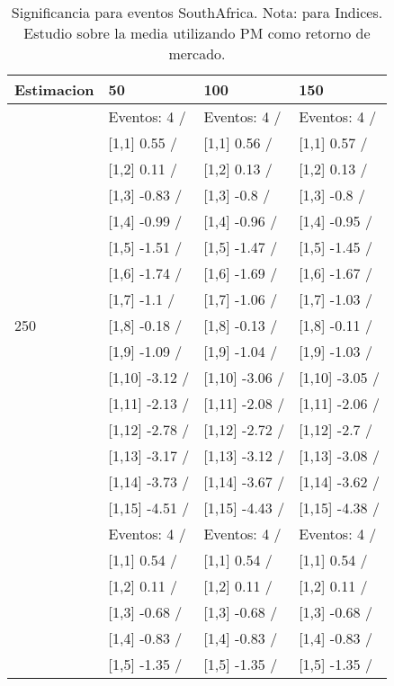 \begin{table}

\caption{Significancia para eventos SouthAfrica. Nota: para Indices. Estudio sobre la media utilizando PM como retorno de mercado.}
\centering
\begin{tabular}[t]{llll}
\toprule
Estimacion & 50 & 100 & 150\\
\midrule
 & Eventos:  4 / & Eventos:  4 / & Eventos:  4 /\\
 & {}[1,1] 0.55  / & {}[1,1] 0.56  / & {}[1,1] 0.57  /\\
 & {}[1,2] 0.11  / & {}[1,2] 0.13  / & {}[1,2] 0.13  /\\
 & {}[1,3] -0.83  / & {}[1,3] -0.8  / & {}[1,3] -0.8  /\\
 & {}[1,4] -0.99  / & {}[1,4] -0.96  / & {}[1,4] -0.95  /\\
\addlinespace
 & {}[1,5] -1.51  / & {}[1,5] -1.47  / & {}[1,5] -1.45  /\\
 & {}[1,6] -1.74  / & {}[1,6] -1.69  / & {}[1,6] -1.67  /\\
 & {}[1,7] -1.1  / & {}[1,7] -1.06  / & {}[1,7] -1.03  /\\
250 & {}[1,8] -0.18  / & {}[1,8] -0.13  / & {}[1,8] -0.11  /\\
 & {}[1,9] -1.09  / & {}[1,9] -1.04  / & {}[1,9] -1.03  /\\
\addlinespace
 & {}[1,10] -3.12  / & {}[1,10] -3.06  / & {}[1,10] -3.05  /\\
 & {}[1,11] -2.13  / & {}[1,11] -2.08  / & {}[1,11] -2.06  /\\
 & {}[1,12] -2.78  / & {}[1,12] -2.72  / & {}[1,12] -2.7  /\\
 & {}[1,13] -3.17  / & {}[1,13] -3.12  / & {}[1,13] -3.08  /\\
 & {}[1,14] -3.73  / & {}[1,14] -3.67  / & {}[1,14] -3.62  /\\
\addlinespace
 & {}[1,15] -4.51  / & {}[1,15] -4.43  / & {}[1,15] -4.38  /\\
 & Eventos:  4 / & Eventos:  4 / & Eventos:  4 /\\
 & {}[1,1] 0.54  / & {}[1,1] 0.54  / & {}[1,1] 0.54  /\\
 & {}[1,2] 0.11  / & {}[1,2] 0.11  / & {}[1,2] 0.11  /\\
 & {}[1,3] -0.68  / & {}[1,3] -0.68  / & {}[1,3] -0.68  /\\
\addlinespace
 & {}[1,4] -0.83  / & {}[1,4] -0.83  / & {}[1,4] -0.83  /\\
 & {}[1,5] -1.35  / & {}[1,5] -1.35  / & {}[1,5] -1.35  /\\

\end{tabular}
\end{table}
